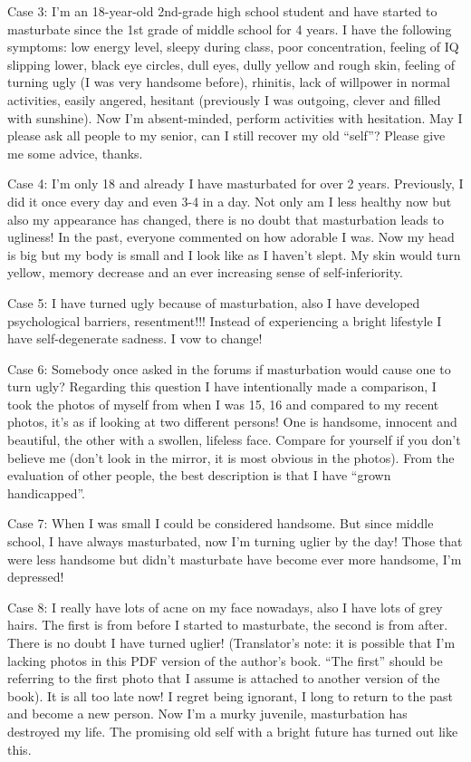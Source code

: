 \documentclass[
]{book}
\begin{document}
Case 3: I'm an 18-year-old 2nd-grade high school student and have started to masturbate since the 1st grade of middle school for 4 years. I have the following symptoms: low energy level, sleepy during class, poor concentration, feeling of IQ slipping lower, black eye circles, dull eyes, dully yellow and rough skin, feeling of turning ugly (I was very handsome before), rhinitis, lack of willpower in normal activities, easily angered, hesitant (previously I was outgoing, clever and filled with sunshine). Now I'm absent-minded, perform activities with hesitation. May I please ask all people to my senior, can I still recover my old ``self''? Please give me some advice, thanks.

Case 4: I'm only 18 and already I have masturbated for over 2 years. Previously, I did it once every day and even 3-4 in a day. Not only am I less healthy now but also my appearance has changed, there is no doubt that masturbation leads to ugliness! In the past, everyone commented on how adorable I was. Now my head is big but my body is small and I look like as I haven't slept. My skin would turn yellow, memory decrease and an ever increasing sense of self-inferiority.

Case 5: I have turned ugly because of masturbation, also I have developed psychological barriers, resentment!!! Instead of experiencing a bright lifestyle I have self-degenerate sadness. I vow to change!

Case 6: Somebody once asked in the forums if masturbation would cause one to turn ugly? Regarding this question I have intentionally made a comparison, I took the photos of myself from when I was 15, 16 and compared to my recent photos, it's as if looking at two different persons! One is handsome, innocent and beautiful, the other with a swollen, lifeless face. Compare for yourself if you don't believe me (don't look in the mirror, it is most obvious in the photos). From the evaluation of other people, the best description is that I have ``grown handicapped''.

Case 7: When I was small I could be considered handsome. But since middle school, I have always masturbated, now I'm turning uglier by the day! Those that were less handsome but didn't masturbate have become ever more handsome, I'm depressed!

Case 8: I really have lots of acne on my face nowadays, also I have lots of grey hairs. The first is from before I started to masturbate, the second is from after. There is no doubt I have turned uglier! (Translator's note: it is possible that I'm lacking photos in this PDF version of the author's book. ``The first'' should be referring to the first photo that I assume is attached to another version of the book). It is all too late now! I regret being ignorant, I long to return to the past and become a new person. Now I'm a murky juvenile, masturbation has destroyed my life. The promising old self with a bright future has turned out like this.
\end{document}
